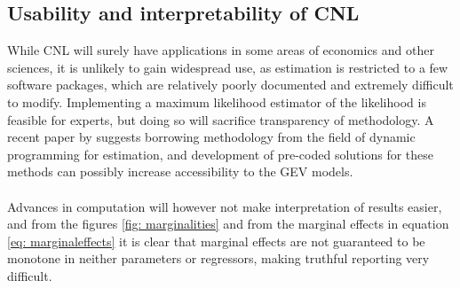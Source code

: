 \subsection{Usability and interpretability of CNL}
While CNL will surely have applications in some areas of economics and other sciences, it is unlikely to gain widespread use, as estimation is restricted to a few software packages, which are relatively poorly documented and extremely difficult to modify. Implementing a maximum likelihood estimator of the likelihood is feasible for experts, but doing so will sacrifice transparency of methodology. A recent paper by \citet{mai_dynamic_2017} suggests borrowing methodology from the field of dynamic programming for estimation, and development of pre-coded solutions for these methods can possibly increase accessibility to the GEV models.
\\ \\
Advances in computation will however not make interpretation of results easier, and from the figures \ref{fig: marginalities} and from the marginal effects in equation \eqref{eq: marginaleffects} it is clear that marginal effects are not guaranteed to be monotone in neither parameters or regressors, making truthful reporting very difficult.
